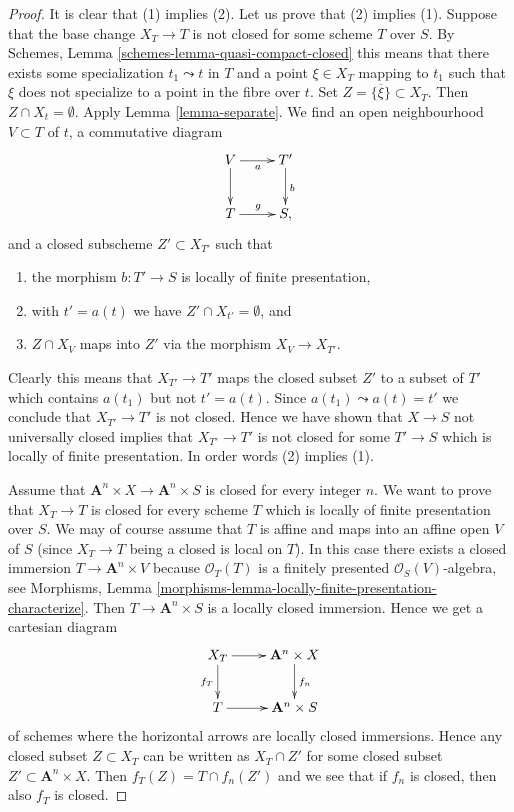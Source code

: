 \documentclass{stacks-project}
\theoremstyle{plain}
\theoremstyle{definition}
\theoremstyle{remark}
\numberwithin{equation}{subsection}
\begin{document}
\begin{proof}
It is clear that (1) implies (2). Let us prove that (2) implies (1).
Suppose that the base change $X_T \to T$ is not closed for some
scheme $T$ over $S$. By
Schemes, Lemma \ref{schemes-lemma-quasi-compact-closed}
this means that there exists some specialization $t_1 \leadsto t$ in
$T$ and a point $\xi \in X_T$ mapping to $t_1$ such that $\xi$ does not
specialize to a point in the fibre over $t$. Set
$Z = \overline{\{\xi\}} \subset X_T$. Then $Z \cap X_t = \emptyset$. Apply
Lemma \ref{lemma-separate}.
We find an open neighbourhood $V \subset T$ of $t$, a commutative diagram
$$
\xymatrix{
V \ar[d] \ar[r]_a & T' \ar[d]^b \\
T \ar[r]^g & S,
}
$$
and a closed subscheme $Z' \subset X_{T'}$ such that
\begin{enumerate}
\item the morphism $b : T' \to S$ is locally of finite presentation,
\item with $t' = a(t)$ we have $Z' \cap X_{t'} = \emptyset$, and
\item $Z \cap X_V$ maps into $Z'$ via the morphism $X_V \to X_{T'}$.
\end{enumerate}
Clearly this means that $X_{T'} \to T'$ maps the closed subset $Z'$
to a subset of $T'$ which contains $a(t_1)$ but not $t' = a(t)$.
Since $a(t_1) \leadsto a(t) = t'$ we conclude that $X_{T'} \to T'$
is not closed. Hence we have shown that $X \to S$ not universally closed
implies that $X_{T'} \to T'$ is not closed for some $T' \to S$
which is locally of finite presentation. In order words (2)
implies (1).

\medskip\noindent
Assume that $\mathbf{A}^n \times X \to \mathbf{A}^n \times S$ is
closed for every integer $n$. We want to prove that $X_T \to T$ is
closed for every scheme $T$ which is locally of finite presentation
over $S$. We may of course assume that $T$ is affine and maps into
an affine open $V$ of $S$ (since $X_T \to T$ being a closed is local on $T$).
In this case there exists a closed immersion $T \to \mathbf{A}^n \times V$
because $\mathcal{O}_T(T)$ is a finitely presented
$\mathcal{O}_S(V)$-algebra, see
Morphisms,
Lemma \ref{morphisms-lemma-locally-finite-presentation-characterize}.
Then $T \to \mathbf{A}^n \times S$ is a locally closed immersion.
Hence we get a cartesian diagram
$$
\xymatrix{
X_T \ar[d]_{f_T} \ar[r] & \mathbf{A}^n \times X \ar[d]^{f_n} \\
T \ar[r] & \mathbf{A}^n \times S
}
$$
of schemes where the horizontal arrows are locally closed immersions.
Hence any closed subset $Z \subset X_T$ can be written as
$X_T \cap Z'$ for some closed subset $Z' \subset \mathbf{A}^n \times X$.
Then $f_T(Z) = T \cap f_n(Z')$ and we see that if $f_n$ is closed, then
also $f_T$ is closed.
\end{proof}
\end{document}
